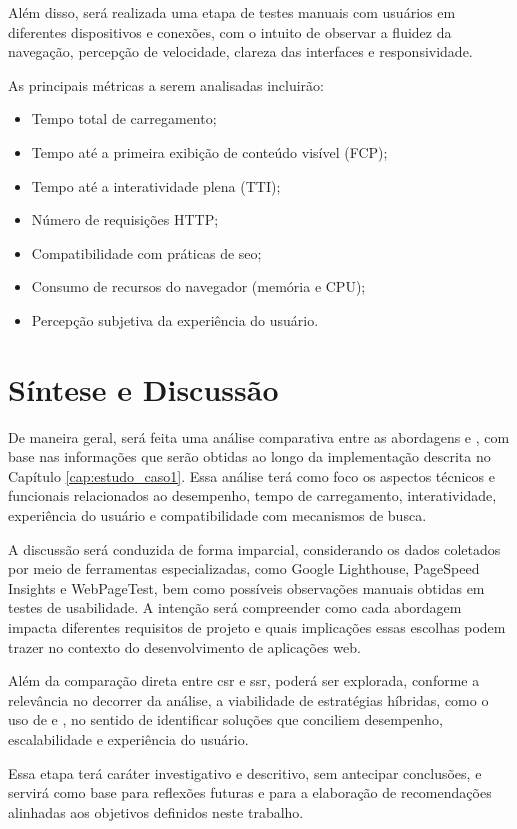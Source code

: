 Além disso, será realizada uma etapa de testes manuais com usuários em diferentes dispositivos e conexões, com o intuito de observar a fluidez da navegação, percepção de velocidade, clareza das interfaces e responsividade.

As principais métricas a serem analisadas incluirão:

\begin{itemize}
\item Tempo total de carregamento;
\item Tempo até a primeira exibição de conteúdo visível (FCP);
\item Tempo até a interatividade plena (TTI);
\item Número de requisições HTTP;
\item Compatibilidade com práticas de \acrshort{seo};
\item Consumo de recursos do navegador (memória e CPU);
\item Percepção subjetiva da experiência do usuário.
\end{itemize}

\section{Síntese e Discussão}
\label{sec:sintese-e-discussao}

De maneira geral, será feita uma análise comparativa entre as abordagens  e , com base nas informações que serão obtidas ao longo da implementação descrita no Capítulo \ref{cap:estudo_caso1}. Essa análise terá como foco os aspectos técnicos e funcionais relacionados ao desempenho, tempo de carregamento, interatividade, experiência do usuário e compatibilidade com mecanismos de busca.

A discussão será conduzida de forma imparcial, considerando os dados coletados por meio de ferramentas especializadas, como Google Lighthouse, PageSpeed Insights e WebPageTest, bem como possíveis observações manuais obtidas em testes de usabilidade. A intenção será compreender como cada abordagem impacta diferentes requisitos de projeto e quais implicações essas escolhas podem trazer no contexto do desenvolvimento de aplicações web.

Além da comparação direta entre {\acrshort{csr}} e {\acrshort{ssr}}, poderá ser explorada, conforme a relevância no decorrer da análise, a viabilidade de estratégias híbridas, como o uso de  e , no sentido de identificar soluções que conciliem desempenho, escalabilidade e experiência do usuário.

Essa etapa terá caráter investigativo e descritivo, sem antecipar conclusões, e servirá como base para reflexões futuras e para a elaboração de recomendações alinhadas aos objetivos definidos neste trabalho.
